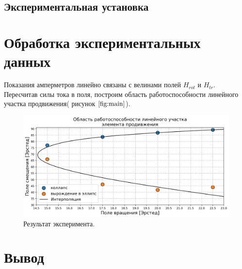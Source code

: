 \documentclass[a4paper, 14pt]{extarticle}
\begin{document}
\subsection*{\textcolor{sub_header}{Экспериментальная установка}}



\section*{\textcolor{header}{Обработка экспериментальных данных}}

Показания амперметров линейно связаны с велинами полей $H_{rot}$ и $H_{tr}$.
Пересчитав силы тока в поля, построим область работоспособности линейного участка 
продвижения( рисунок $\ref{fig:main}$).

\begin{figure}[htbp]
    \centering
    \includegraphics*[width = 1 \textwidth]{out.png}
    \caption{Результат эксперимента.}
    \label{fig:main}
\end{figure}


\section*{\textcolor{header}{Вывод}}
\end{document}

